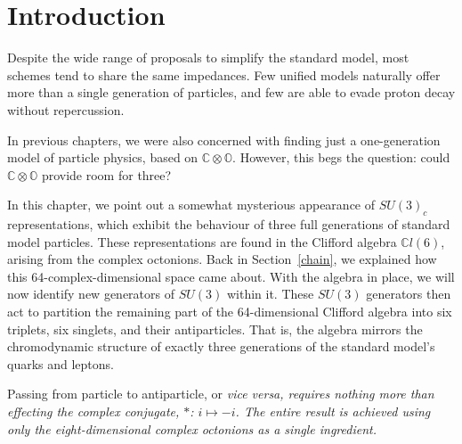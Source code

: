 \documentclass[letterpaper,12pt,titlepage,oneside,final]{book}
\newcommand{\CO}{\mathbb{C}\otimes\mathbb{O}}
\newcommand{\CLsix}{\mathbb{C}l(6)}
\begin{document}
\section{Introduction }

Despite the wide range of proposals to simplify the standard model, most schemes tend to share the same impedances.  Few unified models naturally offer more than a single generation of particles, and few are able to evade proton decay without repercussion.

In previous chapters, we were also concerned with finding just a one-generation model of particle physics, based on $\CO$.  However, this begs the question:  could  $\CO$ provide room for three?  

\medskip

In this chapter, we point out a somewhat mysterious appearance of $SU(3)_c$ representations, which exhibit the behaviour of three full generations of standard model particles.  These representations are found in the Clifford algebra $\CLsix$, arising from the complex octonions.  Back in Section~\ref{chain}, we explained how this 64-complex-dimensional space came about.  With the algebra in place, we will now identify new generators of $SU(3)$ within it.  These $SU(3)$ generators then act to partition the remaining part of the 64-dimensional Clifford algebra into six triplets, six singlets, and their antiparticles.  That is, the algebra mirrors the chromodynamic structure of exactly three generations of the standard model's quarks and leptons.  

Passing from particle to antiparticle, or \it vice versa, \rm requires nothing more than effecting the complex conjugate, $*$: $i \mapsto -i$. The entire result is achieved using only the eight-dimensional complex octonions as a single ingredient.

 




\end{document}
